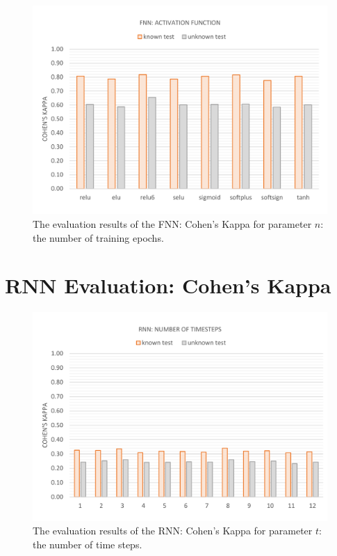 \vspace{-11mm}
\begin{figure}[H]
	\centering\includegraphics[width=\textwidth]{images/evaluation_fnn_a_k}
	\caption[FNN Evaluation: Number of Training Epochs]{The evaluation results of the FNN: Cohen's Kappa for parameter $n$: the number of training epochs.}
	\label{f.evaluation.fnn.a.k}
\end{figure}

\newpage

\section{RNN Evaluation: Cohen's Kappa}\label{c.appendix.kappa.rnn}
\vspace{-13mm}
\begin{figure}[H]
	\centering\includegraphics[width=\textwidth]{images/evaluation_rnn_t_k}
	\caption[RNN Evaluation: Number of Time Steps]{The evaluation results of the RNN: Cohen's Kappa for parameter $t$: the number of time steps.}
	\label{f.evaluation.rnn.t.k}
\end{figure}

